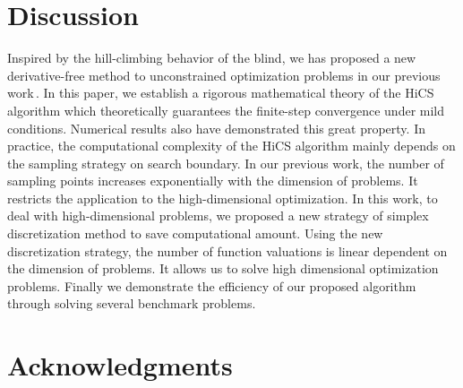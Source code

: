 \documentclass[final,1p,times]{elsarticle}
\begin{document}
\section{Discussion}
\label{sec:conclusion}

Inspired by the hill-climbing behavior of the blind, we has
proposed a new derivative-free method to unconstrained
optimization problems in our previous work\,\cite{huang2017hill}. 
In this paper, we establish a rigorous mathematical theory of the HiCS
algorithm which theoretically guarantees the finite-step convergence
under mild conditions. Numerical results also have demonstrated
this great property. 
In practice, the computational complexity of the HiCS algorithm mainly
depends on the sampling strategy on search boundary.
In our previous work, the number of sampling points
increases exponentially with the dimension of problems. It restricts
the application to the high-dimensional optimization. 
In this work, to deal with high-dimensional problems, 
we proposed a new strategy of simplex
discretization method to save computational amount. Using the new
discretization strategy, the number of function valuations is linear
dependent on the dimension of problems. 
It allows us to solve high dimensional optimization problems. 
Finally we demonstrate the efficiency of our proposed algorithm
through solving several benchmark problems.


\section*{Acknowledgments}


%
%
\end{document}
